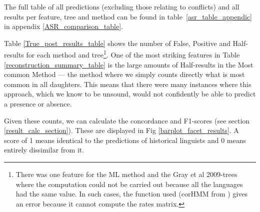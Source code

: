 \documentclass[a4paper,10pt]{article} %
\begin{document}
The full table of all predictions (excluding those relating to conflicts) and all results per feature, tree and method can be found in table~\ref{asr_table_appendic} in appendix \ref{ASR_comparison_table}. 

Table \ref{True_post_results_table} shows the number of False, Positive and Half-results for each method and tree\footnote{There was one feature for the ML method and the Gray et al 2009-trees where the computation could not be carried out because all the languages had the same value. In such cases, the function used (corHMM from \citet{corHMM}) gives an error because it cannot compute the rates matrix.}. One of the most striking features in Table \ref{reconstruction_summary_table} is the large amounts of Half-results in the Most common Method --- the method where we simply counts directly what is most common in all daughters. This means that there were many instances where this approach, which we know to be unsound, would not confidently be able to predict a presence or absence.
 


Given these counts, we can calculate the concordance and F1-scores (see section \ref{result_calc_section}). These are displayed in Fig \ref{barplot_facet_results}. A score of 1 means identical to the predictions of historical linguists and 0 means entirely dissimilar from it.
\end{document}
